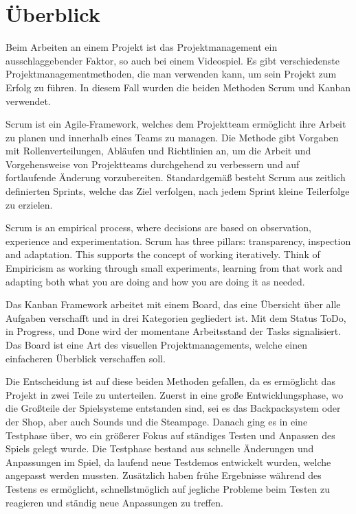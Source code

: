 
\section{Überblick}\label{sec:ueberblick}

\renewcommand{\kapitelautor}{Autor: Nils Hubmann}

%
Beim Arbeiten an einem Projekt ist das Projektmanagement ein ausschlaggebender Faktor, so auch bei einem Videospiel.
Es gibt verschiedenste Projektmanagementmethoden, die man verwenden kann, um sein Projekt zum Erfolg zu führen.
In diesem Fall wurden die beiden Methoden Scrum und Kanban verwendet.

Scrum ist ein Agile-Framework, welches dem Projektteam ermöglicht ihre Arbeit zu planen und innerhalb eines Teams zu managen.
Die Methode gibt Vorgaben mit Rollenverteilungen, Abläufen und Richtlinien an, um die Arbeit und Vorgehensweise von Projektteams durchgehend zu verbessern und auf fortlaufende Änderung vorzubereiten.
Standardgemäß besteht Scrum aus zeitlich definierten Sprints, welche das Ziel verfolgen, nach jedem Sprint kleine Teilerfolge zu erzielen. 

\begin{coolQuote}
Scrum is an empirical process, where decisions are based on observation, experience and experimentation.
Scrum has three pillars: transparency, inspection and adaptation. This supports the concept of working iteratively.
Think of Empiricism as working through small experiments, learning from that work and adapting both what you are doing and how you are doing it as needed.
\end{coolQuote}

Das Kanban Framework arbeitet mit einem Board, das eine Übersicht über alle Aufgaben verschafft und in drei Kategorien gegliedert ist.
Mit dem Status ToDo, in Progress, und Done wird der momentane Arbeitsstand der Tasks signalisiert.
Das Board ist eine Art des visuellen Projektmanagements, welche einen einfacheren Überblick verschaffen soll.

Die Entscheidung ist auf diese beiden Methoden gefallen, da es ermöglicht das Projekt in zwei Teile zu unterteilen.
Zuerst in eine große Entwicklungsphase, wo die Großteile der Spielsysteme entstanden sind, sei es das Backpacksystem oder der Shop, aber auch Sounds und die Steampage.
Danach ging es in eine Testphase über, wo ein größerer Fokus auf ständiges Testen und Anpassen des Spiels gelegt wurde.
Die Testphase bestand aus schnelle Änderungen und Anpassungen im Spiel, da laufend neue Testdemos entwickelt wurden, welche angepasst werden mussten.
Zusätzlich haben frühe Ergebnisse während des Testens es ermöglicht, schnellstmöglich auf jegliche Probleme beim Testen zu reagieren und ständig neue Anpassungen zu treffen.

\renewcommand{\kapitelautor}{}
